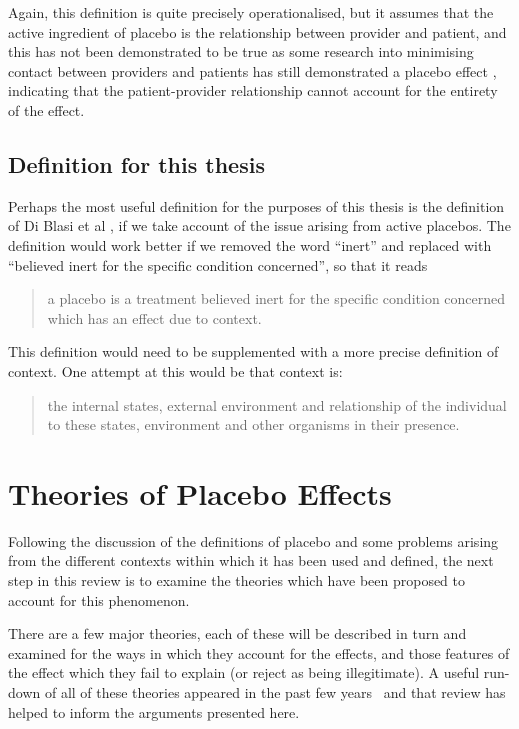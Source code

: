 Again, this definition is quite precisely operationalised, but it assumes that the active ingredient of placebo is the relationship between provider and patient, and this has not been demonstrated to be true as some research into minimising contact between providers and patients has still demonstrated a placebo effect \cite{Hyland2006}, indicating that the patient-provider relationship cannot account for the entirety of the effect.  



\subsection{Definition for this thesis}
\label{sec:defin-this-thes}


Perhaps the most useful definition for the purposes of this thesis is the definition of Di Blasi et al \cite{DiBlasi2001}, if we take account of the issue arising from active placebos. The definition would work better if we removed the word ``inert'' and replaced with ``believed inert for the specific condition concerned'', so that it reads

\begin{quotation}
  a placebo is a treatment believed inert for the specific condition
  concerned which has an effect due to context.
\end{quotation}

This definition would need to be supplemented with a more precise definition of context. One attempt at this would be that context is:

\begin{quotation}
   the internal states, external environment and relationship of the individual to these states, environment and other organisms in their presence.
\end{quotation}





\section{Theories of Placebo Effects}
\label{sec:theor-plac-effects}

Following the discussion of the definitions of placebo and some problems arising from the different contexts within which it has been used and defined, the next step in this review is to examine the theories which have been proposed to account for this phenomenon. 

There are a few major theories, each of these will be described in turn  and examined for the ways in which they account for the effects, and those features of the effect which they fail to explain (or reject as being illegitimate). A useful run-down of all of these theories appeared in the past few years~\cite{Stewart-Williams2004b} and that review has helped to inform the arguments presented here. 

